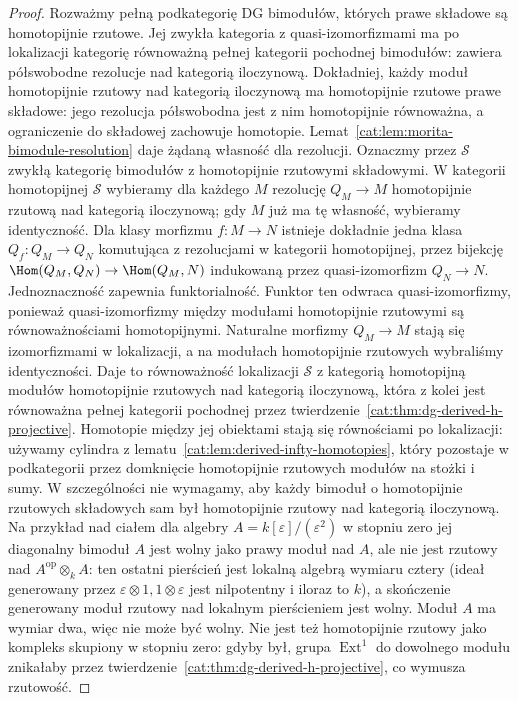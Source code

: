 \begin{proof}
Rozważmy pełną podkategorię DG bimodułów, których prawe składowe są homotopijnie rzutowe. Jej zwykła kategoria z quasi-izomorfizmami ma po lokalizacji kategorię równoważną pełnej kategorii pochodnej bimodułów: zawiera półswobodne rezolucje nad kategorią iloczynową. Dokładniej, każdy moduł homotopijnie rzutowy nad kategorią iloczynową ma homotopijnie rzutowe prawe składowe: jego rezolucja półswobodna jest z nim homotopijnie równoważna, a ograniczenie do składowej zachowuje homotopie. Lemat~\ref{cat:lem:morita-bimodule-resolution} daje żądaną własność dla rezolucji. Oznaczmy przez $\mathcal S$ zwykłą kategorię bimodułów z homotopijnie rzutowymi składowymi. W kategorii homotopijnej $\mathcal S$ wybieramy dla każdego $M$ rezolucję $Q_M\to M$ homotopijnie rzutową nad kategorią iloczynową; gdy $M$ już ma tę własność, wybieramy identyczność. Dla klasy morfizmu $f:M\to N$ istnieje dokładnie jedna klasa $Q_f:Q_M\to Q_N$ komutująca z rezolucjami w kategorii homotopijnej, przez bijekcję $\Hom(Q_M,Q_N)\to\Hom(Q_M,N)$ indukowaną przez quasi-izomorfizm $Q_N\to N$. Jednoznaczność zapewnia funktorialność. Funktor ten odwraca quasi-izomorfizmy, ponieważ quasi-izomorfizmy między modułami homotopijnie rzutowymi są równoważnościami homotopijnymi. Naturalne morfizmy $Q_M\to M$ stają się izomorfizmami w lokalizacji, a na modułach homotopijnie rzutowych wybraliśmy identyczności. Daje to równoważność lokalizacji $\mathcal S$ z kategorią homotopijną modułów homotopijnie rzutowych nad kategorią iloczynową, która z kolei jest równoważna pełnej kategorii pochodnej przez twierdzenie~\ref{cat:thm:dg-derived-h-projective}. Homotopie między jej obiektami stają się równościami po lokalizacji: używamy cylindra z lematu~\ref{cat:lem:derived-infty-homotopies}, który pozostaje w podkategorii przez domknięcie homotopijnie rzutowych modułów na stożki i sumy. W szczególności nie wymagamy, aby każdy bimoduł o homotopijnie rzutowych składowych sam był homotopijnie rzutowy nad kategorią iloczynową. Na przykład nad ciałem dla algebry $A=k[\varepsilon]/(\varepsilon^2)$ w stopniu zero jej diagonalny bimoduł $A$ jest wolny jako prawy moduł nad $A$, ale nie jest rzutowy nad $A^{\mathrm{op}}\otimes_k A$: ten ostatni pierścień jest lokalną algebrą wymiaru cztery (ideał generowany przez $\varepsilon\otimes1,1\otimes\varepsilon$ jest nilpotentny i iloraz to $k$), a skończenie generowany moduł rzutowy nad lokalnym pierścieniem jest wolny. Moduł $A$ ma wymiar dwa, więc nie może być wolny. Nie jest też homotopijnie rzutowy jako kompleks skupiony w stopniu zero: gdyby był, grupa $\operatorname{Ext}^1$ do dowolnego modułu znikałaby przez twierdzenie~\ref{cat:thm:dg-derived-h-projective}, co wymusza rzutowość.


\end{proof}
